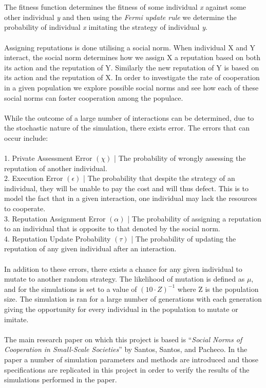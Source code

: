 \documentclass[10pt,a4paper]{article}
\begin{document}
\\\\
The fitness function determines the fitness of some individual \emph{x} against some other individual \emph{y} and then using the \textit{Fermi update rule} we determine the probability of individual \emph{x} imitating the strategy of individual \emph{y}. 
\\\\
Assigning reputations is done utilising a social norm.
When individual X and Y interact, the social norm determines how we assign X a reputation based on both its action and the reputation of Y.
Similarly the new reputation of Y is based on its action and the reputation of X.
In order to investigate the rate of cooperation in a given population we explore possible social norms and see how each of these social norms can foster cooperation among the populace.
\\\\
While the outcome of a large number of interactions can be determined, due to the stochastic nature of the simulation, there exists error.
The errors that can occur include:
\\
\\ 1. Private Assessment Error $(\chi)$ | The probability of wrongly assessing the reputation of another individual.
\\ 2. Execution Error $(\epsilon)$ | The probability that despite the strategy of an individual, they will be unable to pay the cost and will thus defect. This is to model the fact that in a given interaction, one individual may lack the resources to cooperate.
\\ 3. Reputation Assignment Error $(\alpha)$ | The probability of assigning a reputation to an individual that is opposite to that denoted by the social norm.
\\ 4. Reputation Update Probability $(\tau)$ | The probability of updating the reputation of any given individual after an interaction.
\\\\
In addition to these errors, there exists a chance for any given individual to mutate to another random strategy.
The likelihood of mutation is defined as $\mu$, and for the simulations is set to a value of $(10 \cdot Z)^{-1}$ where Z is the population size.
The simulation is ran for a large number of generations with each generation giving the opportunity for every individual in the population to mutate or imitate.
\\\\
The main research paper on which this project is based is “\textit{Social Norms of Cooperation in Small-Scale Societies}” by Santos, Santos, and Pacheco. 
In the paper a number of simulation parameters and methods are introduced and those specifications are replicated in this project in order to verify the results of the simulations performed in the paper.
\pagebreak
\end{document}
